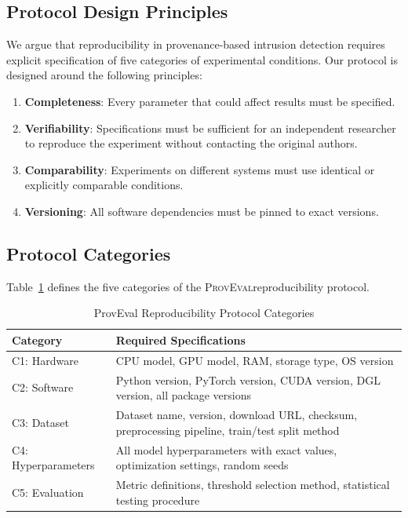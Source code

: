 \documentclass[11pt,a4paper]{article}
\newcommand{\proveval}{\textsc{ProvEval}}
\begin{document}
\subsection{Protocol Design Principles}

We argue that reproducibility in provenance-based intrusion detection requires explicit specification of five categories of experimental conditions. Our protocol is designed around the following principles:

\begin{enumerate}[leftmargin=*]
    \item \textbf{Completeness}: Every parameter that could affect results must be specified.
    \item \textbf{Verifiability}: Specifications must be sufficient for an independent researcher to reproduce the experiment without contacting the original authors.
    \item \textbf{Comparability}: Experiments on different systems must use identical or explicitly comparable conditions.
    \item \textbf{Versioning}: All software dependencies must be pinned to exact versions.
\end{enumerate}

\subsection{Protocol Categories}

Table~\ref{tab:protocol-categories} defines the five categories of the \proveval reproducibility protocol.

\begin{table}[H]
\centering
\caption{ProvEval Reproducibility Protocol Categories}
\label{tab:protocol-categories}
\begin{tabular}{@{}lp{8cm}@{}}
\toprule
\textbf{Category} & \textbf{Required Specifications} \\
\midrule
C1: Hardware & CPU model, GPU model, RAM, storage type, OS version \\
C2: Software & Python version, PyTorch version, CUDA version, DGL version, all package versions \\
C3: Dataset & Dataset name, version, download URL, checksum, preprocessing pipeline, train/test split method \\
C4: Hyperparameters & All model hyperparameters with exact values, optimization settings, random seeds \\
C5: Evaluation & Metric definitions, threshold selection method, statistical testing procedure \\
\bottomrule
\end{tabular}
\end{table}
\end{document}
